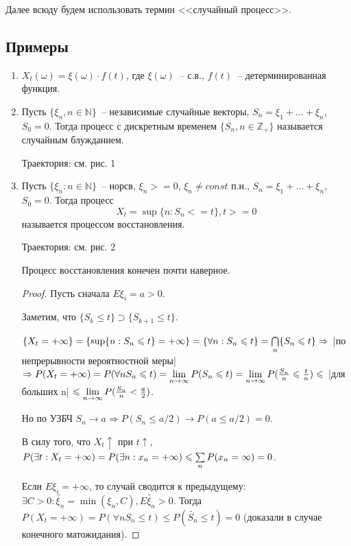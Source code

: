 \begin{remark}
Далее всюду будем использовать термин <<случайный процесс>>.
\end{remark}

\subsection{Примеры}
\begin{enumerate}
\item $X_t(\omega) = \xi(\omega) \cdot f(t)$, где $\xi(\omega)$~-- с.в., $f(t)$~-- детерминированная функция.
\item Пусть $\{\xi_n, n\in\mathbb{N}\}$~-- независимые случайные векторы, $S_n = \xi_1 + \dots + \xi_n$,
$S_0 = 0$. Тогда процесс с дискретным временем $\{S_n, n \in \mathbb{Z}_+\}$
называется случайным блужданием.

Траектория: см. рис. 1
\item Пусть $\{\xi_n : n \in \mathbb{N}\}$~-- норсв, $\xi_n >= 0$, $\xi_n \neq const$ п.н.,
$S_n = \xi_1 + \dots + \xi_n$, $S_0 = 0$. Тогда процесс
$$X_t = \sup\{n: S_n <= t\}, t >= 0$$
называется процессом восстановления.

Траектория: см. рис. 2

\begin{statement}
Процесс восстановления конечен почти наверное.
\end{statement}
\begin{proof}
Пусть сначала $E\xi_i = a > 0$.

Заметим, что $\{S_k \leq t\} \supset \{S_{k+1} \leq t\}$.

$\{X_t=+\infty\} = \{\sup\{n:S_n\leqslant t\} = +\infty\} =
\{\forall n: S_n \leqslant t\} = \bigcap\limits_n\{S_n \leqslant t\} \Rightarrow$
|по непрерывности вероятностной меры|
$\Rightarrow P(X_t = +\infty) = P(\forall n S_n \leqslant t) =
\lim\limits_{n \to \infty} P(S_n \leqslant t)
= \lim\limits_{n \to \infty} P(\frac{S_n}{n} \leqslant \frac{t}{n}) \leqslant$
|для больших n|
$\leqslant \lim\limits_{n \to \infty} P(\frac{S_n}{n} < \frac{a}{2})$.

Но по УЗБЧ $S_n \to a \Rightarrow P(S_n \leq a/2) \to P(a \leq a/2) = 0$.

В силу того, что $X_t\uparrow$ при $t\uparrow$,
$P(\exists t: X_t = +\infty) = P(\exists n: x_n = +\infty) \leqslant \sum\limits_{n}{P(x_n = \infty)} = 0$.

Если $E\xi_i = +\infty$, то случай сводится к предыдущему:
$\exists C > 0: \tilde{\xi_n} = \min(\xi_n, C), E\tilde{\xi_n} > 0$.
Тогда $P(X_t = +\infty) = P(\forall n S_n \leq t) \leq P(\tilde{S_n} \leq t) = 0$
(доказали в случае конечного матожидания).
\end{proof}


\end{enumerate}
